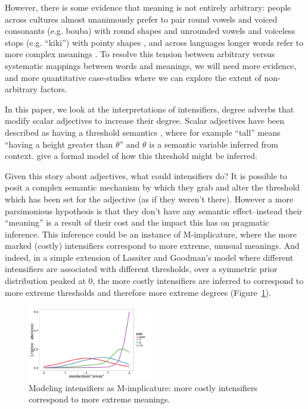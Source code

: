 \documentclass[10pt,letterpaper]{article}
\begin{document}
However, there is some evidence that meaning is not entirely arbitrary: people across cultures almost unanimously prefer to pair round vowels and voiced consonants (e.g. bouba) with round shapes and unrounded vowels and voiceless stops (e.g. ``kiki'') with pointy shapes \cite{maluma-takete, bouba-kiki, bouba-kiki2, takete-uloomo}, and across languages longer words refer to more complex meanings \cite{lewis}. To resolve this tension between arbitrary versus systematic mappings between words and meanings, we will need more evidence, and more quantitative case-studies where we can explore the extent of non-arbitrary factors.

In this paper, we look at the interpretations of intensifiers, degree adverbs that modify scalar adjectives to increase their degree. Scalar adjectives have been described as having a threshold semantics \cite{kennedy}, where for example ``tall'' means ``having a height greater than $\theta$'' and $\theta$ is a semantic variable inferred from context.  give a formal model of how this threshold might be inferred.

Given this story about adjectives, what could intensifiers do? It is possible to posit a complex semantic mechanism by which they grab and alter the threshold which has been set for the adjective (as if they weren't there). However a more parsimonious hypothesis is that they don't have any semantic effect--instead their ``meaning'' is a result of their cost and the impact this has on pragmatic inference. This inference could be an instance of M-implicature, where the more marked (costly) intensifiers correspond to more extreme, unusual meanings. And indeed, in a simple extension of Lassiter and Goodman's model where different intensifiers are associated with different thresholds, over a symmetric prior distribution peaked at 0, the more costly intensifiers are inferred to correspond to more extreme thresholds and therefore more extreme degrees (Figure~\ref{model}).

\begin{figure}[ht]
\begin{center}
\includegraphics[width=0.48\textwidth]{analysis_files_for_writeup/images/model_results.png}
\end{center}
\caption{Modeling intensifiers as M-implicature: more costly intensifiers correspond to more extreme meanings.} 
\label{model}
\end{figure}
\end{document}
